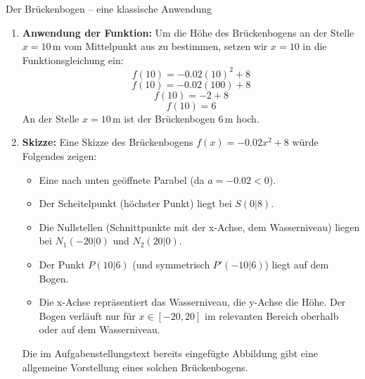 \begin{loesungsumgebung}{Der Brückenbogen – eine klassische Anwendung}
\begin{enumerate}[label=(\alph*)]
    \item \textbf{Anwendung der Funktion:}
    Um die Höhe des Brückenbogens an der Stelle $x=10\,$m vom Mittelpunkt aus zu bestimmen, setzen wir $x=10$ in die Funktionsgleichung ein:
    $$f(10) = -0.02(10)^2 + 8$$
    $$f(10) = -0.02(100) + 8$$
    $$f(10) = -2 + 8$$
    $$f(10) = 6$$
    An der Stelle $x=10\,$m ist der Brückenbogen $6\,$m hoch.

    \item \textbf{Skizze:}
    Eine Skizze des Brückenbogens $f(x) = -0.02x^2 + 8$ würde Folgendes zeigen:
    \begin{itemize}
        \item Eine nach unten geöffnete Parabel (da $a=-0.02 < 0$).
        \item Der Scheitelpunkt (höchster Punkt) liegt bei $S(0|8)$.
        \item Die Nullstellen (Schnittpunkte mit der x-Achse, dem Wasserniveau) liegen bei $N_1(-20|0)$ und $N_2(20|0)$.
        \item Der Punkt $P(10|6)$ (und symmetrisch $P'(-10|6)$) liegt auf dem Bogen.
        \item Die x-Achse repräsentiert das Wasserniveau, die y-Achse die Höhe. Der Bogen verläuft nur für $x \in [-20, 20]$ im relevanten Bereich oberhalb oder auf dem Wasserniveau.
    \end{itemize}
    Die im Aufgabenstellungstext bereits eingefügte Abbildung gibt eine allgemeine Vorstellung eines solchen Brückenbogens. 

\end{enumerate}
\end{loesungsumgebung}

